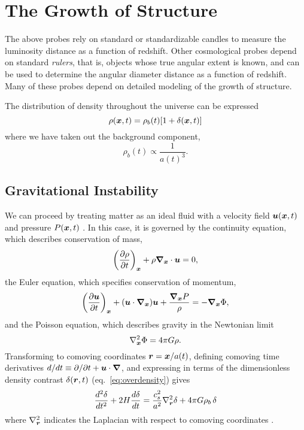 \section{The Growth of Structure}
\label{sec:growth}
The above probes rely on standard or standardizable candles to measure the
luminosity distance as a function of redshift.  Other cosmological probes
depend on standard {\it rulers}, that is, objects whose true angular extent
is known, and can be used to determine the angular diameter distance as
a function of redshift.  Many of these probes depend on detailed modeling
of the growth of structure.

The distribution of density throughout the universe can be expressed
\begin{equation}
  \label{eq:overdensity}
  \rho(\boldsymbol{x}, t) = \rho_b(t)[1 + \delta(\boldsymbol{x}, t)]
\end{equation}
where we have taken out the background component,
\begin{equation}
  \rho_b(t) \propto \frac{1}{a(t)^3}.
\end{equation}

\subsection{Gravitational Instability}
We can proceed by treating matter as an ideal fluid with a
velocity field $\boldsymbol{u}(\boldsymbol{x}, t)$ and pressure $P(\boldsymbol{x}, t)$
\citep{longair2008galaxy}.
In this case, it is governed by the
continuity equation, which describes conservation of mass,
\begin{equation}
  \label{eq:continuity}
  \left(\frac{\partial\rho}{\partial t}\right)_{\boldsymbol{x}}
  + \rho\boldsymbol{\nabla}_{\boldsymbol{x}}\cdot\boldsymbol{u} = 0,
\end{equation}
the Euler equation, which specifies conservation of momentum,
\begin{equation}
  \label{eq:euler}
  \left(\frac{\partial\boldsymbol{u}}{\partial t}\right)_{\boldsymbol{x}}
  + (\boldsymbol{u}\cdot\boldsymbol{\nabla}_{\boldsymbol{x}})\boldsymbol{u}
  + \frac{\boldsymbol{\nabla}_{\boldsymbol{x}}P}{\rho}
  = -\boldsymbol{\nabla}_{\boldsymbol{x}}\Phi,
\end{equation}
and the Poisson equation, which describes gravity in the Newtonian limit
\begin{equation}
  \label{eq:poisson}
  \nabla_{\boldsymbol{x}}^2\Phi = 4\pi G\rho.
\end{equation}
Transforming to comoving coordinates $\boldsymbol{r} = \boldsymbol{x}/a(t)$,
defining comoving time derivatives
$d/dt \equiv \partial/\partial t + \boldsymbol{u}\cdot\boldsymbol{\nabla}$,
and expressing in terms of the dimensionless density contrast
$\delta(\boldsymbol{r}, t)$ (eq.~\ref{eq:overdensity}) gives
\begin{equation}
  \label{eq:delta_evolution}
  \frac{d^2\delta}{d t^2} + 2 H \frac{d\delta}{d t}
  = \frac{c_s^2}{a^2}\nabla_{\boldsymbol{r}}^2\delta + 4\pi G \rho_b\,\delta
\end{equation}
where $\nabla^2_{\boldsymbol{r}}$ indicates the Laplacian with respect to comoving
coordinates \citep[for derivation see][\S11.2]{longair2008galaxy}.

